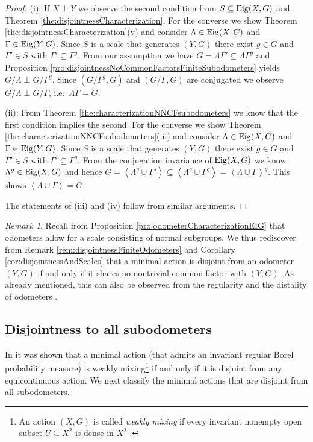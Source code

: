 \documentclass[12pt, reqno]{amsart}
\theoremstyle{definition}
\theoremstyle{remark}
\newtheorem{remark}[theorem]{Remark}
\numberwithin{equation}{section}
\theoremstyle{theorem}
\theoremstyle{remark}
\newcommand{\grouphull}[1]{\left\langle #1 \right\rangle}
\def\Eig{{\rm Eig}}
\begin{document}
\begin{proof}
(i): 
    If $X\perp Y$ we observe the second condition from $S\subseteq \Eig(X,G)$ and Theorem \ref{the:disjointnessCharacterization}. 
    For the converse we show Theorem \ref{the:disjointnessCharacterization}(v) and consider $\Lambda\in \Eig(X,G)$ and $\Gamma\in \Eig(Y,G)$.
    Since $S$ is a scale that generates $(Y,G)$ there exist $g\in G$ and $\Gamma'\in S$ with $\Gamma'\subseteq \Gamma^g$. 
    From our assumption we have $G=\Lambda\Gamma'\subseteq \Lambda\Gamma^g$ and Proposition \ref{pro:disjointnessNoCommonFactorsFiniteSubodometers} yields $G/\Lambda\perp G/\Gamma^g$. Since $(G/\Gamma^g,G)$ and $(G/\Gamma,G)$ are conjugated we observe 
    $G/\Lambda \perp G/\Gamma$, i.e.\ $\Lambda\Gamma=G$.  

(ii):
    From Theorem \ref{the:characterizationNNCFsubodometers} we know that the first condition implies the second. 
    For the converse we show Theorem \ref{the:characterizationNNCFsubodometers}(iii) and consider $\Lambda\in \Eig(X,G)$ and $\Gamma\in \Eig(Y,G)$.
    Since $S$ is a scale that generates $(Y,G)$ there exist $g\in G$ and $\Gamma'\in S$ with $\Gamma'\subseteq \Gamma^g$. 
    From the conjugation invariance of $\Eig(X,G)$ we know $\Lambda^g\in \Eig(X,G)$ and hence
    $G=\grouphull{\Lambda^g\cup \Gamma'}\subseteq \grouphull{\Lambda^g\cup \Gamma^g}=\grouphull{\Lambda\cup \Gamma}^g$. 
    This shows $\grouphull{\Lambda\cup \Gamma}=G$. 

The statements of (iii) and (iv) follow from similar arguments. 
\end{proof}

\begin{remark}
    Recall from Proposition \ref{pro:odometerCharacterizationEIG} that odometers allow for a scale consisting of normal subgroups. We thus rediscover from Remark \ref{rem:disjointnessFiniteOdometers} and Corollary \ref{cor:disjointnessAndScales} that a minimal action is disjoint from an odometer $(Y,G)$ if and only if it shares no nontrivial common factor with $(Y,G)$. 
    As already mentioned, this can also be observed from the regularity and the distality of odometers \cite[Theorem~11.21]{auslander1988minimal}.
\end{remark}



\subsection{Disjointness to all subodometers}
\label{subsec:DisjointnessOfSubodometers_DisjointnessToAllSubodometers}
In \cite[Chapter~11]{auslander1988minimal} it was shown that a minimal action (that admits an invariant regular Borel probability measure) is weakly mixing\footnote{
    An action $(X,G)$ is called \emph{weakly mixing} if every invariant nonempty open subset $U\subseteq X^2$ is dense in $X^2$ \cite{auslander1988minimal}. 
}
if and only if it is disjoint from any equicontinuous action. 
We next classify the minimal actions that are disjoint from all subodometers. 
\end{document}
